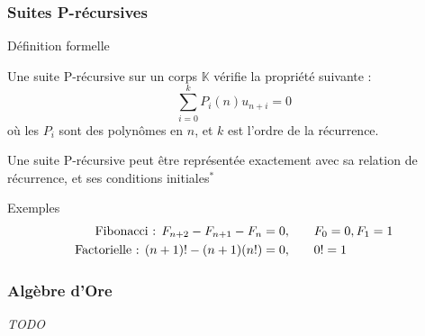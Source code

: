 \documentclass{beamer}
\begin{document}
\begin{frame}
\frametitle{Suites P-récursives}
\begin{center}
\begin{block}{Définition formelle} \begin{center}
    Une suite P-récursive sur un corps $\mathbb K$ vérifie la propriété suivante :
    \begin{equation*}
        \sum^k_{i=0} P_i(n)u_{n+i} = 0
    \end{equation*}
    où les $P_i$ sont des polynômes en $n$, et $k$ est l'ordre de la récurrence.
\end{center} \end{block}
Une suite P-récursive peut être représentée exactement avec sa relation de récurrence,
et ses conditions initiales$^*$
\begin{block}{Exemples}
    \begin{eqnarray*}
        \textnormal{Fibonacci : } F_{n+2} - F_{n+1} - F_n = 0, & \qquad F_0 = 0, F_1 = 1 \\
        \textnormal{Factorielle : } (n+1)! - (n+1)(n!) = 0, & \qquad 0! = 1 \\
    \end{eqnarray*}
\end{block}
\end{center}
\end{frame}


\begin{frame}
\frametitle{Algèbre d'Ore}
\begin{center}
\emph{TODO}\\
\end{center}
\end{frame}

\end{document}
